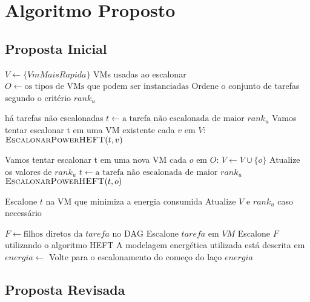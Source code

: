 \chapter{Algoritmo Proposto}
\label{cap:algoritmo}

\section{Proposta Inicial}

\begin{codebox}
	\li $V \gets \{VmMaisRapida\}$ \Comment VMs usadas ao escalonar
	\li $O \gets \text{os tipos de VMs que podem ser instanciadas}$
	\li Ordene o conjunto de tarefas segundo o critério $rank_u$
   
	\li \While há tarefas não escalonadas
		\li \Do $t \gets \text{a tarefa não escalonada de maior } rank_u$
		\zi
	    \li \Comment Vamos tentar escalonar t em uma VM existente
	    \li \For cada $v$ em $V$:
		    \li \Do	$\textnormal{\scshape EscalonarPowerHEFT}(t, v)$
	    \End
	    
	    \zi
	    \li \Comment Vamos tentar escalonar t em uma nova VM
	    \li \For cada $o$ em $O$:
		    \li \Do	$V \gets V \cup \{o\}$
		    \li Atualize os valores de $rank_u$
		    \li $t \gets \text{a tarefa não escalonada de maior } rank_u$
		    \li $\textnormal{\scshape EscalonarPowerHEFT}(t, o)$
	    \End
	    
	    \li Escalone $t$ na VM que minimiza a energia consumida
	    \li Atualize $V$ e $rank_u$ caso necessário
	\End
\End
\end{codebox}

\begin{codebox}
	\li $F \gets \text{filhos diretos da } tarefa \text{ no DAG}$
    \li Escalone $tarefa$ em $VM$
	\li Escalone $F$ utilizando o algoritmo \textsc{HEFT}
	\zi
	\li \Comment A modelagem energética utilizada está descrita em
    	\cite{guerout:energy_aware_simulation}
	\li $energia \gets$ 
		\li Volte para o escalonamento do começo do laço
	\li \Return $energia$
\end{codebox}

\section{Proposta Revisada} %
\label{sec:proposta_revisada}

